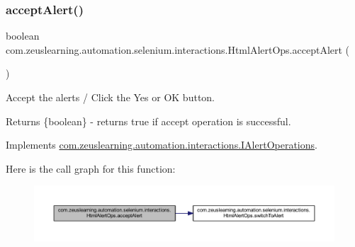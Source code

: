 \subsubsection{\texorpdfstring{accept\+Alert()}{acceptAlert()}}
{\footnotesize\ttfamily boolean com.\+zeuslearning.\+automation.\+selenium.\+interactions.\+Html\+Alert\+Ops.\+accept\+Alert (\begin{DoxyParamCaption}{ }\end{DoxyParamCaption})\hspace{0.3cm}{\ttfamily [inline]}}

Accept the alerts / Click the {\ttfamily Yes} or {\ttfamily OK} button.

\begin{DoxyReturn}{Returns}
\{boolean\} -\/ returns {\ttfamily true} if accept operation is successful. 
\end{DoxyReturn}


Implements \hyperlink{interfacecom_1_1zeuslearning_1_1automation_1_1interactions_1_1IAlertOperations_a8be09398358c0a51e5ff2058969853fd}{com.\+zeuslearning.\+automation.\+interactions.\+I\+Alert\+Operations}.

Here is the call graph for this function\+:\nopagebreak
\begin{figure}[H]
\begin{center}
\leavevmode
\includegraphics[width=350pt]{d9/d71/classcom_1_1zeuslearning_1_1automation_1_1selenium_1_1interactions_1_1HtmlAlertOps_ab29d982ce85b76e2f85b09d0c724f331_cgraph}
\end{center}
\end{figure}
\hypertarget{classcom_1_1zeuslearning_1_1automation_1_1selenium_1_1interactions_1_1HtmlAlertOps_aac58187434100d2fe2091f388f082c22}{}\label{classcom_1_1zeuslearning_1_1automation_1_1selenium_1_1interactions_1_1HtmlAlertOps_aac58187434100d2fe2091f388f082c22} 
